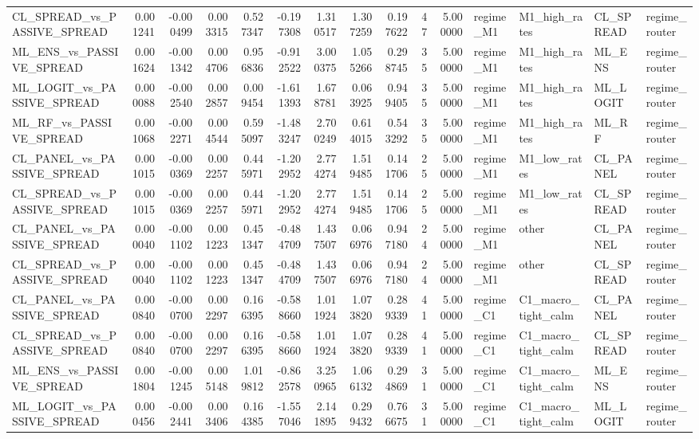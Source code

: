 \begin{table}
\begin{tabular}{lrrrrrrrrrrllll}
CL_SPREAD_vs_PASSIVE_SPREAD & 0.001241 & -0.000499 & 0.003315 & 0.527347 & -0.197308 & 1.310517 & 1.307259 & 0.197622 & 47 & 5.000000 & regime_M1 & M1_high_rates & CL_SPREAD & regime_router \\
ML_ENS_vs_PASSIVE_SPREAD & 0.001624 & -0.001342 & 0.004706 & 0.956836 & -0.912522 & 3.000375 & 1.055266 & 0.298745 & 35 & 5.000000 & regime_M1 & M1_high_rates & ML_ENS & regime_router \\
ML_LOGIT_vs_PASSIVE_SPREAD & 0.000088 & -0.002540 & 0.002857 & 0.009454 & -1.611393 & 1.678781 & 0.063925 & 0.949405 & 35 & 5.000000 & regime_M1 & M1_high_rates & ML_LOGIT & regime_router \\
ML_RF_vs_PASSIVE_SPREAD & 0.001068 & -0.002271 & 0.004544 & 0.595097 & -1.483247 & 2.700249 & 0.614015 & 0.543292 & 35 & 5.000000 & regime_M1 & M1_high_rates & ML_RF & regime_router \\
CL_PANEL_vs_PASSIVE_SPREAD & 0.001015 & -0.000369 & 0.002257 & 0.445971 & -1.202952 & 2.774274 & 1.519485 & 0.141706 & 25 & 5.000000 & regime_M1 & M1_low_rates & CL_PANEL & regime_router \\
CL_SPREAD_vs_PASSIVE_SPREAD & 0.001015 & -0.000369 & 0.002257 & 0.445971 & -1.202952 & 2.774274 & 1.519485 & 0.141706 & 25 & 5.000000 & regime_M1 & M1_low_rates & CL_SPREAD & regime_router \\
CL_PANEL_vs_PASSIVE_SPREAD & 0.000040 & -0.001102 & 0.001223 & 0.451347 & -0.484709 & 1.437507 & 0.066976 & 0.947180 & 24 & 5.000000 & regime_M1 & other & CL_PANEL & regime_router \\
CL_SPREAD_vs_PASSIVE_SPREAD & 0.000040 & -0.001102 & 0.001223 & 0.451347 & -0.484709 & 1.437507 & 0.066976 & 0.947180 & 24 & 5.000000 & regime_M1 & other & CL_SPREAD & regime_router \\
CL_PANEL_vs_PASSIVE_SPREAD & 0.000840 & -0.000700 & 0.002297 & 0.166395 & -0.588660 & 1.011924 & 1.073820 & 0.289339 & 41 & 5.000000 & regime_C1 & C1_macro_tight_calm & CL_PANEL & regime_router \\
CL_SPREAD_vs_PASSIVE_SPREAD & 0.000840 & -0.000700 & 0.002297 & 0.166395 & -0.588660 & 1.011924 & 1.073820 & 0.289339 & 41 & 5.000000 & regime_C1 & C1_macro_tight_calm & CL_SPREAD & regime_router \\
ML_ENS_vs_PASSIVE_SPREAD & 0.001804 & -0.001245 & 0.005148 & 1.019812 & -0.862578 & 3.250965 & 1.066132 & 0.294869 & 31 & 5.000000 & regime_C1 & C1_macro_tight_calm & ML_ENS & regime_router \\
ML_LOGIT_vs_PASSIVE_SPREAD & 0.000456 & -0.002441 & 0.003406 & 0.164385 & -1.557046 & 2.141895 & 0.299432 & 0.766675 & 31 & 5.000000 & regime_C1 & C1_macro_tight_calm & ML_LOGIT & regime_router \\

\end{tabular}
\end{table}
